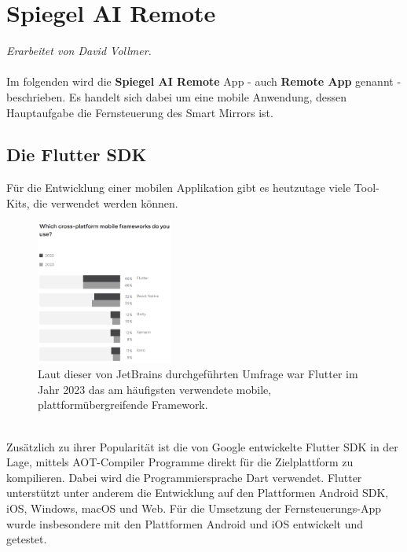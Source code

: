 \chapter{Spiegel AI Remote}
\textit{Erarbeitet von David Vollmer.} \\ \\
Im folgenden wird die \textbf{Spiegel AI Remote} App - auch \textbf{Remote App} genannt - beschrieben. Es handelt sich dabei um eine mobile Anwendung, dessen Hauptaufgabe die Fernsteuerung des Smart Mirrors ist.

\section{Die Flutter\texttrademark{} SDK}
Für die Entwicklung einer mobilen Applikation gibt es heutzutage viele Tool-Kits, die verwendet werden können.
\begin{figure}[h]
    \centering
    \includegraphics[width=0.4\textwidth]{pictures/frameworks_stats.png}
    \captionsetup{justification=centering, labelformat=simple, singlelinecheck=false}
    \caption{Laut dieser von JetBrains durchgeführten Umfrage war Flutter im Jahr 2023 das am häufigsten verwendete mobile, plattformübergreifende Framework.\cite{jetbrains_survey}}
    \label{fig:jetbrains_survey}
\end{figure} \\
Zusätzlich zu ihrer Popularität ist die von Google entwickelte Flutter SDK in der Lage, mittels AOT-Compiler Programme direkt für die Zielplattform zu kompilieren. Dabei wird die Programmiersprache Dart verwendet.\cite{dart_platform} Flutter unterstützt unter anderem die Entwicklung auf den Plattformen Android SDK, iOS, Windows, macOS und Web.\cite{flutter_supported_platforms} Für die Umsetzung der Fernsteuerungs-App wurde insbesondere mit den Plattformen Android und iOS entwickelt und getestet.

